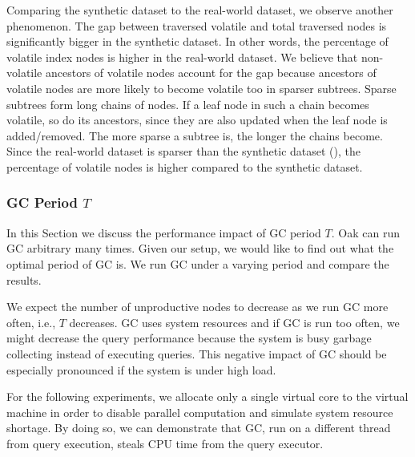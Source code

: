 \documentclass[abstracton,12pt]{scrartcl}
\theoremstyle{definition}
\begin{document}
Comparing the synthetic dataset to the real-world dataset, we observe another phenomenon.
The gap between traversed volatile and total traversed nodes is significantly bigger
in the synthetic dataset. In other words, the percentage of volatile index nodes
is higher in the real-world dataset. We believe that non-volatile
ancestors of volatile nodes account for the gap
because ancestors of volatile nodes are more likely to become volatile too in
sparser subtrees. Sparse subtrees form long chains of nodes. If a leaf node
in such a chain becomes volatile, so do its ancestors, since they are also
updated when the leaf node is added/removed. The more sparse a subtree is, the longer
the chains become.
Since the real-world dataset is sparser than the synthetic dataset (),
the percentage of volatile nodes is higher compared to the synthetic dataset.

\vspace{-0.3cm}

\subsubsection{GC Period $T$}

\label{sec:periodicity}

In this Section we discuss the performance impact of GC period $T$. Oak can run
GC arbitrary many times. Given our setup, we would like to find out what the
optimal period of GC is. We run GC under a varying period and compare
the results.

We expect the number of unproductive nodes to decrease as we run GC more often,
i.e., $T$ decreases. GC uses system resources and if GC is run too often,
we might decrease the query performance because the system is busy garbage
collecting instead of executing queries. This negative impact of GC should
be especially pronounced if the system is under high load.

For the following experiments, we allocate only a single virtual core to the
virtual machine in order to disable parallel computation and simulate system
resource shortage. 
By doing so, we can demonstrate that GC, run on a different thread from
query execution, steals CPU time from the query executor.
\end{document}
